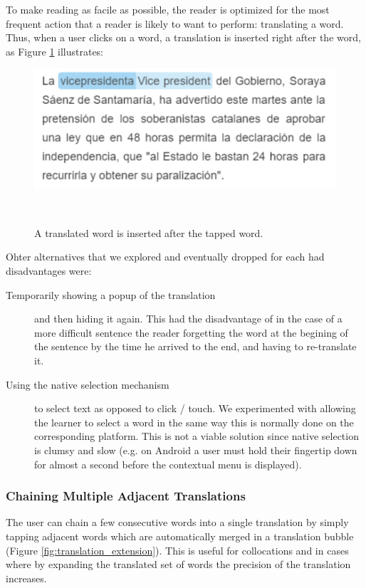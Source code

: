 To make reading as facile as possible, the reader is optimized for the most frequent action that a reader is likely to want to perform: translating a word. Thus, when a user clicks on a word, a translation is inserted right after the word, as Figure \ref{fig:translated_word} illustrates: 

\begin{figure}[h!]
\centering
  \includegraphics[width=0.8\columnwidth]{figures/translated_word}
  \caption{A translated word is inserted after the tapped word.}~\label{fig:translated_word}
\end{figure}

Ohter alternatives that we explored and eventually dropped for each had disadvantages were: 
\begin{description}

  \item [Temporarily showing a popup of the translation] and then hiding it again. This had the disadvantage of in the case of a more difficult sentence the reader forgetting the word at the begining of the sentence by the time he arrived to the end, and having to re-translate it. 

  \item [Using the native selection mechanism] to select text as opposed to click / touch. We experimented with allowing the learner to select a word in the same way this is normally done on the corresponding platform. This is not a viable solution since native selection is clumsy and slow (e.g. on Android a user must hold their fingertip down for almost a second before the contextual menu is displayed). 
\end{description}


\subsubsection{Chaining Multiple Adjacent Translations}
The user can chain a few consecutive words into a single translation by simply tapping adjacent words which are automatically merged in a translation bubble (Figure \ref{fig:translation_extension}). This is useful for collocations and in cases where by expanding the translated set of words the precision of the translation increases. 

